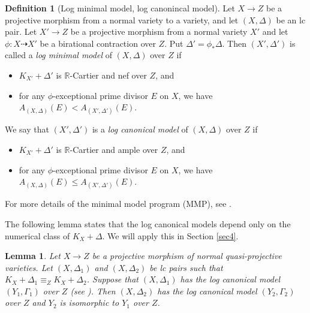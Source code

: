 \documentclass[12pt,twoside]{amsart}
\newtheorem{lem}[thm]{Lemma}
\theoremstyle{definition}
\newtheorem{defn}[thm]{Definition}
\begin{document}
\begin{defn}[Log minimal model, log canonincal model]
Let $X \to Z$ be a projective morphism from a normal variety to a variety, and let $(X,\Delta)$ be an lc pair. 
Let $X' \to Z$ be a projective morphism from a normal variety $X'$ and let $\phi \colon X \dashrightarrow X'$ be a birational contraction over $Z$. 
Put $\Delta'=\phi_{*}\Delta$. 
Then $(X',\Delta')$ is called a {\em log minimal model} of $(X,\Delta)$ over $Z$ if 
\begin{itemize}
\item
$K_{X'}+\Delta'$ is $\mathbb{R}$-Cartier and nef over $Z$, and 
\item
for any $\phi$-exceptional prime divisor $E$ on $X$, we have $A_{(X,\Delta)}(E)<A_{(X',\Delta')}(E)$.
\end{itemize}
We say that $(X',\Delta')$ is a {\em log canonical model} of $(X,\Delta)$ over $Z$ if 
\begin{itemize}
\item
$K_{X'}+\Delta'$ is $\mathbb{R}$-Cartier and ample over $Z$, and 
\item
for any $\phi$-exceptional prime divisor $E$ on $X$, we have $A_{(X,\Delta)}(E)\leq A_{(X',\Delta')}(E)$.
\end{itemize}
For more details of the minimal model program (MMP), see \cite{BCHM}.
\end{defn}


The following lemma states that the log canonical models depend only on the numerical class of $K_X+\Delta$.
We will apply this in Section \ref{sec4}.

\begin{lem}\label{lem--lc-model}
Let $X \to Z$ be a projective morphism of normal quasi-projective varieties. 
Let $(X,\Delta_{1})$ and $(X,\Delta_{2})$ be lc pairs such that $K_{X}+\Delta_{1} \equiv_{Z} K_{X}+\Delta_{2}$. 
Suppose that $(X,\Delta_{1})$ has the log canonical model $(Y_{1},\Gamma_{1})$ over $Z$ (see \cite[Definition 3.50]{KM}). Then $(X,\Delta_{2})$ has the log canonical model $(Y_{2},\Gamma_{2})$ over $Z$ and $Y_{2}$ is isomorphic to $Y_{1}$ over $Z$. 
\end{lem}
\end{document}
